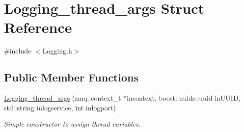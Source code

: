 \hypertarget{structLogging__thread__args}{\section{Logging\-\_\-thread\-\_\-args Struct Reference}
\label{structLogging__thread__args}
}


{\ttfamily \#include $<$Logging.\-h$>$}

\subsection*{Public Member Functions}
\begin{DoxyCompactItemize}
\item 
\hypertarget{structLogging__thread__args_a9496cec11539e17b104d3cbdf3174fdb}{\hyperlink{structLogging__thread__args_a9496cec11539e17b104d3cbdf3174fdb}{Logging\-\_\-thread\-\_\-args} (zmq\-::context\-\_\-t $\ast$incontext, boost\-::uuids\-::uuid in\-U\-U\-I\-D, std\-::string inlogservice, int inlogport)}\label{structLogging__thread__args_a9496cec11539e17b104d3cbdf3174fdb}

\begin{DoxyCompactList}\small\item\em Simple constructor to assign thread variables. \end{DoxyCompactList}\end{DoxyCompactItemize}
